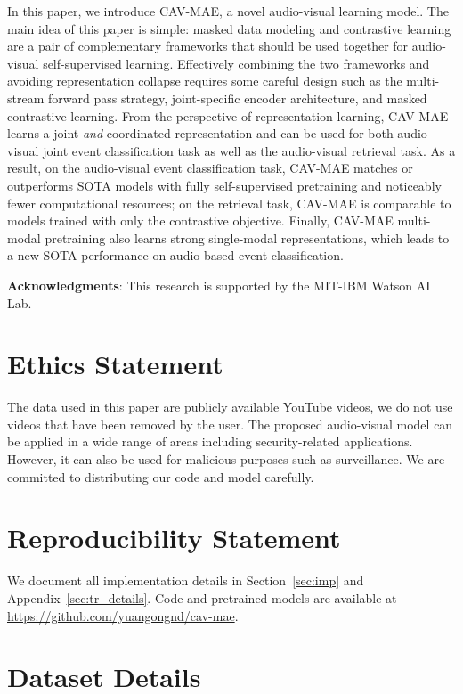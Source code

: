 \documentclass{article} \usepackage{iclr2023_conference,times}
\begin{document}
In this paper, we introduce CAV-MAE, a novel audio-visual learning model. The main idea of this paper is simple: masked data modeling and contrastive learning are a pair of complementary frameworks that should be used together for audio-visual self-supervised learning. Effectively combining the two frameworks and avoiding representation collapse requires some careful design such as the multi-stream forward pass strategy, joint-specific encoder architecture, and masked contrastive learning. From the perspective of representation learning, CAV-MAE learns a joint \emph{and} coordinated representation and can be used for both audio-visual joint event classification task as well as the audio-visual retrieval task. As a result, on the audio-visual event classification task, CAV-MAE matches or outperforms SOTA models with fully self-supervised pretraining and noticeably fewer computational resources; on the retrieval task, CAV-MAE is comparable to models trained with only the contrastive objective. Finally, CAV-MAE multi-modal pretraining also learns strong single-modal representations, which leads to a new SOTA performance on audio-based event classification.

\textbf{Acknowledgments}: This research is supported by the MIT-IBM Watson AI Lab.

\section*{Ethics Statement}

The data used in this paper are publicly available YouTube videos, we do not use videos that have been removed by the user. The proposed audio-visual model can be applied in a wide range of areas including security-related applications. However, it can also be used for malicious purposes such as surveillance. We are committed to distributing our code and model carefully.

\section*{Reproducibility Statement}
We document all implementation details in Section~\ref{sec:imp} and Appendix~\ref{sec:tr_details}. Code and pretrained models are available at \url{https://github.com/yuangongnd/cav-mae}. 




\appendix

\section{Dataset Details}
\label{sec:dataset_details}
\end{document}

